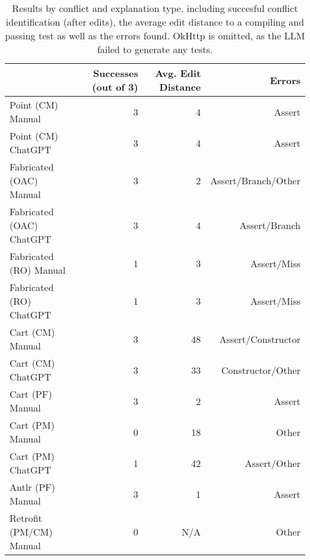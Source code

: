 \begin{table}[t]
    \centering
    \begin{tabular}{@{\extracolsep{\fill}} lrrr} \toprule
                             & Successes (out of 3) & Avg. Edit Distance & Errors \\
    \midrule
    Point (CM) Manual        & 3 & 4 & Assert \\
    Point (CM) ChatGPT       & 3 & 4 & Assert \\
    Fabricated (OAC) Manual  & 3 & 2 & Assert/Branch/Other \\
    Fabricated (OAC) ChatGPT & 3 & 4 & Assert/Branch \\
    Fabricated (RO) Manual   & 1 & 3 & Assert/Miss \\
    Fabricated (RO) ChatGPT  & 1 & 3 & Assert/Miss \\
    Cart (CM) Manual         & 3 & 48 & Assert/Constructor \\
    Cart (CM) ChatGPT        & 3 & 33 & Constructor/Other \\
    Cart (PF) Manual         & 3 & 2 & Assert \\
    Cart (PM) Manual         & 0 & 18 & Other \\
    Cart (PM) ChatGPT        & 1 & 42 & Assert/Other \\
    Antlr (PF) Manual        & 3 & 1 & Assert \\
    Retrofit (PM/CM) Manual  & 0 & N/A & Other \\
    \midrule
    \end{tabular}
    \caption{Results by conflict and explanation type, including succesful conflict identification (after edits), the average edit distance to a compiling and passing test as well as the errors found.
    OkHttp is omitted, as the LLM failed to generate any tests.
    \label{tab:results:rq2}}
\end{table}

